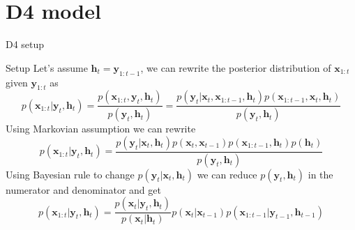 \documentclass{beamer}
\begin{document}
\section{D4 model}

\begin{frame}{D4 setup}
    \begin{block}{Setup}
        Let's assume $\boldsymbol{h}_{t} = \boldsymbol{y}_{1:t-1}$, we can rewrite the posterior distribution of $\boldsymbol{x}_{1:t}$ given $\boldsymbol{y}_{1:t}$ as
        $$p(\boldsymbol{x}_{1:t} | \boldsymbol{y}_{t}, \boldsymbol{h}_{t}) = \dfrac{p(\boldsymbol{x}_{1:t}, \boldsymbol{y}_{t}, \boldsymbol{h}_{t})}{p(\boldsymbol{y}_{t}, \boldsymbol{h}_{t})} = \dfrac{p(\boldsymbol{y}_{t}| \boldsymbol{x}_{t}, \boldsymbol{x}_{1:t-1}, \boldsymbol{h}_{t})p(\boldsymbol{x}_{1:t-1}, \boldsymbol{x}_{t}, \boldsymbol{h}_{t})}{p(\boldsymbol{y}_{t}, \boldsymbol{h}_{t})}$$
        Using Markovian assumption we can rewrite
        $$p(\boldsymbol{x}_{1:t} | \boldsymbol{y}_{t}, \boldsymbol{h}_{t}) = \dfrac{p(\boldsymbol{y}_{t}| \boldsymbol{x}_{t}, \boldsymbol{h}_{t})p(\boldsymbol{x}_{t}, \boldsymbol{x}_{t-1})p(\boldsymbol{x}_{1:t-1}, \boldsymbol{h}_{t})p(\boldsymbol{h}_{t})}{p(\boldsymbol{y}_{t}, \boldsymbol{h}_{t})}$$
        Using Bayesian rule to change $p(\boldsymbol{y}_{t}| \boldsymbol{x}_{t}, \boldsymbol{h}_{t})$ we can reduce $p(\boldsymbol{y}_{t}, \boldsymbol{h}_{t})$ in the numerator and denominator and get
        \begin{equation}\label{D4_setup}
           p(\boldsymbol{x}_{1:t} | \boldsymbol{y}_{t}, \boldsymbol{h}_{t}) = \dfrac{p(\boldsymbol{x}_{t}| \boldsymbol{y}_{t}, \boldsymbol{h}_{t})}{p(\boldsymbol{x}_{t}| \boldsymbol{h}_{t})}p(\boldsymbol{x}_{t}| \boldsymbol{x}_{t-1})p(\boldsymbol{x}_{1:t-1} | \boldsymbol{y}_{t-1}, \boldsymbol{h}_{t-1}) 
        \end{equation}
    \end{block}
\end{frame}
\end{document}
